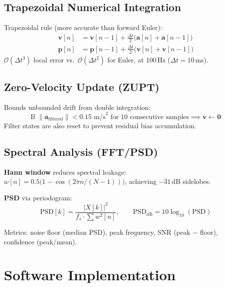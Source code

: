 \documentclass[12pt,a4paper]{article}
\begin{document}
\subsection{Trapezoidal Numerical Integration}

Trapezoidal rule (more accurate than forward Euler):
\begin{align}
\mathbf{v}[n] &= \mathbf{v}[n\!-\!1] + \frac{\Delta t}{2}\bigl(\mathbf{a}[n] + \mathbf{a}[n\!-\!1]\bigr) \\
\mathbf{p}[n] &= \mathbf{p}[n\!-\!1] + \frac{\Delta t}{2}\bigl(\mathbf{v}[n] + \mathbf{v}[n\!-\!1]\bigr)
\end{align}
$\mathcal{O}(\Delta t^3)$ local error vs.\ $\mathcal{O}(\Delta t^2)$ for Euler, at 100\,Hz ($\Delta t = 10$\,ms).

\subsection{Zero-Velocity Update (ZUPT)}

Bounds unbounded drift from double integration:
$$\text{If } \|\mathbf{a}_{\text{filtered}}\| < 0.15\text{ m/s}^2 \text{ for 10 consecutive samples} \implies \mathbf{v} \leftarrow \mathbf{0}$$
Filter states are also reset to prevent residual bias accumulation.

\subsection{Spectral Analysis (FFT/PSD)}

\textbf{Hann window} reduces spectral leakage:
$w[n] = 0.5\bigl(1 - \cos(2\pi n/(N-1))\bigr)$, achieving $-31$\,dB sidelobes.

\textbf{PSD} via periodogram:
\begin{equation}
\text{PSD}[k] = \frac{|X[k]|^2}{f_s \cdot \sum w^2[n]}, \qquad
\text{PSD}_{\text{dB}} = 10\log_{10}(\text{PSD})
\end{equation}

Metrics: noise floor (median PSD), peak frequency, SNR (peak $-$ floor), confidence (peak/mean).

\section{Software Implementation}
\end{document}

